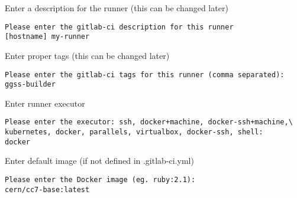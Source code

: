 Enter a description for the runner (this can be changed later)
\begin{lstlisting}
Please enter the gitlab-ci description for this runner
[hostname] my-runner
\end{lstlisting}

Enter proper tags (this can be changed later)
\begin{lstlisting}
Please enter the gitlab-ci tags for this runner (comma separated):
ggss-builder
\end{lstlisting}

Enter runner executor
\begin{lstlisting}
Please enter the executor: ssh, docker+machine, docker-ssh+machine,\
kubernetes, docker, parallels, virtualbox, docker-ssh, shell:
docker
\end{lstlisting}

Enter default image (if not defined in .gitlab-ci.yml)
\begin{lstlisting}
Please enter the Docker image (eg. ruby:2.1):
cern/cc7-base:latest
\end{lstlisting}